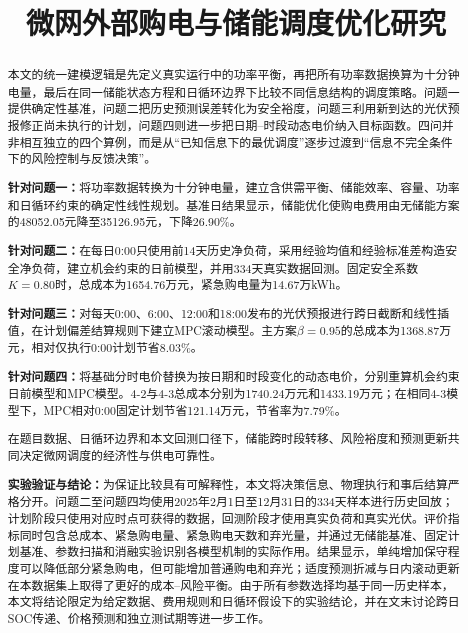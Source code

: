 \documentclass{cumcmthesis}
\title{微网外部购电与储能调度优化研究}
\begin{document}
\maketitle

\begin{abstract}
\textbf{}本文的统一建模逻辑是先定义真实运行中的功率平衡，再把所有功率数据换算为十分钟电量，最后在同一储能状态方程和日循环边界下比较不同信息结构的调度策略。问题一提供确定性基准，问题二把历史预测误差转化为安全裕度，问题三利用新到达的光伏预报修正尚未执行的计划，问题四则进一步把日期--时段动态电价纳入目标函数。四问并非相互独立的四个算例，而是从“已知信息下的最优调度”逐步过渡到“信息不完全条件下的风险控制与反馈决策”。

\textbf{针对问题一：}将功率数据转换为十分钟电量，建立含供需平衡、储能效率、容量、功率和日循环约束的确定性线性规划。基准日结果显示，储能优化使购电费用由无储能方案的48052.05元降至35126.95元，下降26.90\%。

\textbf{针对问题二：}在每日0:00只使用前14天历史净负荷，采用经验均值和经验标准差构造安全净负荷，建立机会约束的日前模型，并用334天真实数据回测。固定安全系数$K=0.80$时，总成本为1654.76万元，紧急购电量为14.67万kWh。

\textbf{针对问题三：}对每天0:00、6:00、12:00和18:00发布的光伏预报进行跨日截断和线性插值，在计划偏差结算规则下建立MPC滚动模型。主方案$\beta=0.95$的总成本为1368.87万元，相对仅执行0:00计划节省8.03\%。

\textbf{针对问题四：}将基础分时电价替换为按日期和时段变化的动态电价，分别重算机会约束日前模型和MPC模型。4-2与4-3总成本分别为1740.24万元和1433.19万元；在相同4-3模型下，MPC相对0:00固定计划节省121.14万元，节省率为7.79\%。

在题目数据、日循环边界和本文回测口径下，储能跨时段转移、风险裕度和预测更新共同决定微网调度的经济性与供电可靠性。


\textbf{实验验证与结论：}为保证比较具有可解释性，本文将决策信息、物理执行和事后结算严格分开。问题二至问题四均使用2025年2月1日至12月31日的334天样本进行历史回放；计划阶段只使用对应时点可获得的数据，回测阶段才使用真实负荷和真实光伏。评价指标同时包含总成本、紧急购电量、紧急购电天数和弃光量，并通过无储能基准、固定计划基准、参数扫描和消融实验识别各模型机制的实际作用。结果显示，单纯增加保守程度可以降低部分紧急购电，但可能增加普通购电和弃光；适度预测折减与日内滚动更新在本数据集上取得了更好的成本--风险平衡。由于所有参数选择均基于同一历史样本，本文将结论限定为给定数据、费用规则和日循环假设下的实验结论，并在文末讨论跨日SOC传递、价格预测和独立测试期等进一步工作。

\end{abstract}
\end{document}
